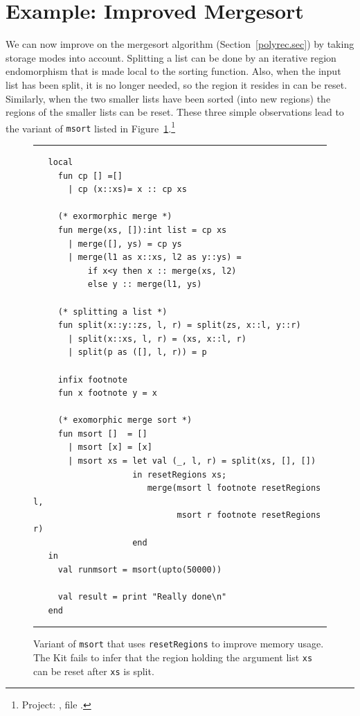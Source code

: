 \documentclass[12pt]{book}
\begin{document}
\section{Example: Improved Mergesort}
\label{improvedmerge.sec}
We can now improve on the 
%
%
mergesort algorithm (Section~\ref{polyrec.sec}) by taking storage
modes into account. Splitting a list can be done by an iterative
region endomorphism that is made local to the sorting function.  Also,
when the input list has been split, it is no longer needed, so the
region it resides in can be reset. Similarly, when the two smaller
lists have been sorted (into new regions) the regions of the smaller
lists can be reset. These three simple observations lead to the
variant of {\tt msort} listed in
Figure~\ref{msortreset1.fig}.\footnote{Project:
  , file
  .}
\begin{figure}
\hrule
\medskip
\begin{verbatim}
   local
     fun cp [] =[]
       | cp (x::xs)= x :: cp xs

     (* exormorphic merge *)
     fun merge(xs, []):int list = cp xs
       | merge([], ys) = cp ys
       | merge(l1 as x::xs, l2 as y::ys) = 
           if x<y then x :: merge(xs, l2) 
           else y :: merge(l1, ys)

     (* splitting a list *)
     fun split(x::y::zs, l, r) = split(zs, x::l, y::r)
       | split(x::xs, l, r) = (xs, x::l, r)
       | split(p as ([], l, r)) = p

     infix footnote
     fun x footnote y = x

     (* exomorphic merge sort *)
     fun msort []  = []
       | msort [x] = [x]
       | msort xs = let val (_, l, r) = split(xs, [], [])
                    in resetRegions xs;
                       merge(msort l footnote resetRegions l, 
                             msort r footnote resetRegions r)
                    end
   in
     val runmsort = msort(upto(50000))

     val result = print "Really done\n"
   end
\end{verbatim}
\caption{Variant of {\tt msort} that uses {\tt resetRegions} to improve 
  memory usage. The Kit fails to infer that the region holding the
  argument list {\tt xs} can be reset after {\tt xs} is split.}
\label{msortreset1.fig}
\medskip \hrule
\end{figure}
\end{document}

